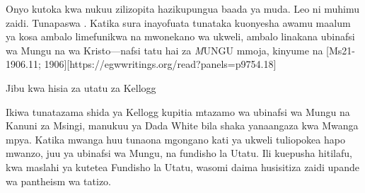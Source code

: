 Onyo kutoka kwa nukuu zilizopita hazikupungua baada ya muda. Leo ni muhimu zaidi. Tunapaswa . Katika sura inayofuata tunataka kuonyesha awamu maalum ya kosa ambalo limefunikwa na mwonekano wa ukweli, ambalo linakana ubinafsi wa Mungu na wa Kristo—nafsi tatu hai za \textit MUNGU {mmoja}, kinyume na [Ms21-1906.11; 1906][https://egwwritings.org/read?panels=p9754.18]



Jibu kwa hisia za utatu za Kellogg

Ikiwa tunatazama shida ya Kellogg kupitia mtazamo wa ubinafsi wa Mungu na Kanuni za Msingi, manukuu ya Dada White bila shaka yanaangaza kwa Mwanga mpya. Katika mwanga huu tunaona mgongano kati ya ukweli tuliopokea hapo mwanzo, juu ya ubinafsi wa Mungu, na fundisho la Utatu. Ili kuepusha hitilafu, kwa maslahi ya kutetea Fundisho la Utatu, wasomi daima husisitiza zaidi upande wa pantheism wa tatizo.
